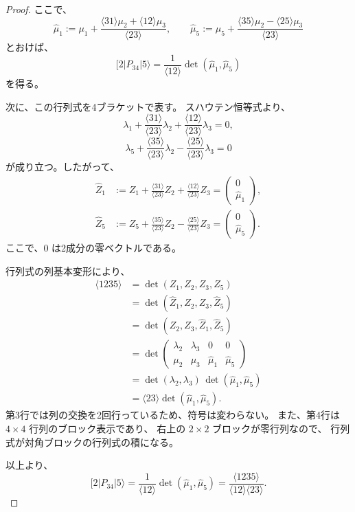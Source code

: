 \documentclass[uplatex,dvipdfmx,a4paper,11pt]{jsarticle}
\renewcommand{\proofname}{Proof}
\newenvironment{myproof}[1][\proofname]
  {\begin{proof}[#1]}
  {\end{proof}}
\numberwithin{equation}{section}
\begin{document}
\begin{myproof}
  ここで、
  \[
    \widehat\mu_1
      :=
      \mu_1+
      \frac{
        \langle31\rangle\mu_2+\langle12\rangle\mu_3
      }{\langle23\rangle},
    \qquad
    \widehat\mu_5
      :=
      \mu_5+
      \frac{
        \langle35\rangle\mu_2-\langle25\rangle\mu_3
      }{\langle23\rangle}
  \]
  とおけば、
  \[
    [2|P_{34}|5\rangle
      =
      \frac{1}{\langle12\rangle}
      \det(\widehat\mu_1,\widehat\mu_5)
  \]
  を得る。

  次に、この行列式を4ブラケットで表す。
  スハウテン恒等式より、
  \[
    \lambda_1
    +\frac{\langle31\rangle}{\langle23\rangle}\lambda_2
    +\frac{\langle12\rangle}{\langle23\rangle}\lambda_3
    =0,
  \]
  \[
    \lambda_5
    +\frac{\langle35\rangle}{\langle23\rangle}\lambda_2
    -\frac{\langle25\rangle}{\langle23\rangle}\lambda_3
    =0
  \]
  が成り立つ。したがって、
  \[
    \begin{aligned}
      \widehat Z_1
      &:=
      Z_1+
      \frac{\langle31\rangle}{\langle23\rangle}Z_2+
      \frac{\langle12\rangle}{\langle23\rangle}Z_3
      =
      \begin{pmatrix}
        0\\
        \widehat\mu_1
      \end{pmatrix},\\
      \widehat Z_5
      &:=
      Z_5+
      \frac{\langle35\rangle}{\langle23\rangle}Z_2-
      \frac{\langle25\rangle}{\langle23\rangle}Z_3
      =
      \begin{pmatrix}
        0\\
        \widehat\mu_5
      \end{pmatrix}.
    \end{aligned}
  \]
  ここで、$0$ は2成分の零ベクトルである。

  行列式の列基本変形により、
  \[
    \begin{aligned}
      \langle1235\rangle
      &=\det(Z_1,Z_2,Z_3,Z_5)\\
      &=\det(\widehat Z_1,Z_2,Z_3,\widehat Z_5)\\
      &=\det(Z_2,Z_3,\widehat Z_1,\widehat Z_5)\\
      &=
      \det
      \begin{pmatrix}
        \lambda_2&\lambda_3&0&0\\
        \mu_2&\mu_3&\widehat\mu_1&\widehat\mu_5
      \end{pmatrix}\\
      &=\det(\lambda_2,\lambda_3)\,
        \det(\widehat\mu_1,\widehat\mu_5)\\
      &=\langle23\rangle
        \det(\widehat\mu_1,\widehat\mu_5).
    \end{aligned}
  \]
  第3行では列の交換を2回行っているため、符号は変わらない。
  また、第4行は $4\times4$ 行列のブロック表示であり、
  右上の $2\times2$ ブロックが零行列なので、
  行列式が対角ブロックの行列式の積になる。

  以上より、
  \[
    [2|P_{34}|5\rangle
      =
      \frac{1}{\langle12\rangle}
      \det(\widehat\mu_1,\widehat\mu_5)
      =
      \frac{\langle1235\rangle}
           {\langle12\rangle\langle23\rangle}.
  \]
\end{myproof}
\end{document}
